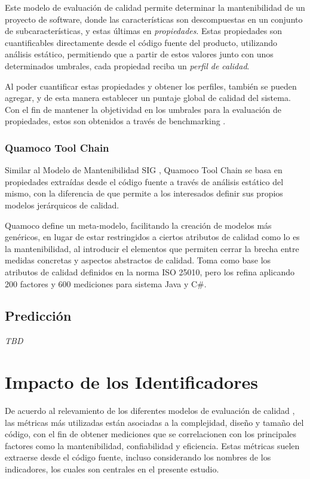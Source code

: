 Este modelo de evaluación de calidad \cite{Heitlager2007} permite determinar la mantenibilidad
de un proyecto de software, donde las características son descompuestas en un
conjunto de subcaracterísticas, y estas últimas en \textit{propiedades}.
Estas propiedades son cuantificables directamente desde el código fuente del producto, utilizando
análisis estático, permitiendo que a partir de estos valores junto con unos determinados umbrales,
cada propiedad reciba un \textit{perfil de calidad}.

Al poder cuantificar estas propiedades y obtener los perfiles, también se pueden agregar,
y de esta manera establecer un puntaje global de calidad del sistema.
Con el fin de mantener la objetividad en los umbrales para la evaluación de propiedades,
estos son obtenidos a través de benchmarking \cite{Alves2010}.

\subsubsection{Quamoco Tool Chain}

Similar al Modelo de Mantenibilidad SIG \cite{Heitlager2007}, Quamoco Tool Chain \cite{Wagner2012}
se basa en propiedades extraídas desde el código fuente a través de análisis estático del mismo,
con la diferencia de que permite a los interesados definir sus propios modelos jerárquicos
de calidad.

Quamoco define un meta-modelo, facilitando la creación de modelos más genéricos, en lugar de
estar restringidos a ciertos atributos de calidad como lo es la mantenibilidad, al introducir
el elementos que permiten cerrar la brecha entre medidas concretas y aspectos abstractos de
calidad.
Toma como base los atributos de calidad definidos en la norma ISO 25010, pero los refina
aplicando 200 factores y 600 mediciones para sistema Java y C\#.

\subsection{Predicción}

\textit{TBD}

\section{Impacto de los Identificadores}

De acuerdo al relevamiento de los diferentes modelos de evaluación de calidad \cite{XXX},
las métricas más utilizadas están asociadas a la complejidad, diseño y tamaño del código,
con el fin de obtener mediciones que se correlacionen con los principales factores como la
mantenibilidad, confiabilidad y eficiencia.
Estas métricas suelen extraerse desde el código fuente, incluso considerando los nombres de los
indicadores, los cuales son centrales en el presente estudio.

